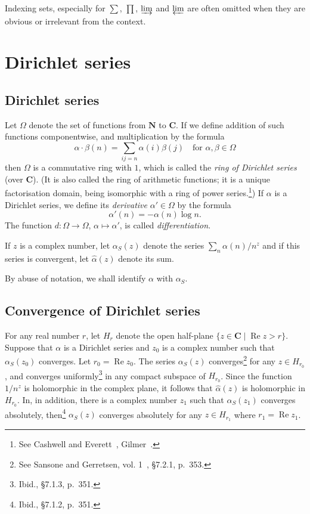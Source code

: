 \documentclass[10pt]{article}
\theoremstyle{definition}
\def\NN{\mathbf{N}}
\def\CC{\mathbf{C}}
\DeclareMathOperator{\re}{Re}
\def\fnon{See Cashwell and Everett~\cite{bib:31}, Gilmer~\cite{bib:63}.}
\def\fntw{See Sansone and Gerretsen, vol. 1~\cite{bib:162}, \S7.2.1, p.~353.}
\def\fnth{Ibid., \S7.1.3, p.~351.}
\def\fnfo{Ibid., \S7.1.2, p.~351.}
\begin{document}
Indexing sets, especially for $\sum$, $\prod$, $\varinjlim$ and $\varprojlim$ are often omitted when they are obvious or irrelevant from the context.



\section{Dirichlet series}
\label{ch:1}

\subsection{Dirichlet series}
\label{ch:1.1}

Let $\Omega$ denote the set of functions from $\NN$ to $\CC$.
If we define addition of such functions componentwise, and multiplication by the formula
\[
\alpha \cdot \beta(n)
= \sum_{ij=n} \alpha(i) \beta(j)
\quad
\text{for $\alpha,\beta \in \Omega$}
\]
then $\Omega$ is a commutative ring with $1$, which is called the \emph{ring of Dirichlet series} (over $\CC$).
(It is also called the ring of arithmetic functions; it is a unique factorisation domain, being isomorphic with a ring of power series.\footnote{\fnon})
If $\alpha$ is a Dirichlet series, we define its \emph{derivative} $\alpha' \in \Omega$ by the formula
\[
\alpha'(n) = -\alpha(n) \log n.
\]
The function $d : \Omega \to \Omega$, $\alpha \mapsto \alpha'$, is called \emph{differentiation}.

If $z$ is a complex number, let $\alpha_S(z)$ denote the series $\sum_n \alpha(n) / n^z$ and if this series is convergent, let $\widehat \alpha(z)$ denote its sum.

By abuse of notation, we shall identify $\alpha$ with $\alpha_S$.


\subsection{Convergence of Dirichlet series}
\label{ch:1.2}

For any real number $r$, let $H_r$ denote the open half-plane $\{ z \in \CC \mid \re z > r \}$.
Suppose that $\alpha$ is a Dirichlet series and $z_0$ is a complex number such that $\alpha_S(z_0)$ converges.
Let $r_0 = \re z_0$.
The series $\alpha_S(z)$ converges\footnote{\fntw} for any $z \in H_{r_0}$, and converges uniformly\footnote{\fnth} in any compact subspace of $H_{r_0}$.
Since the function $1/n^z$ is holomorphic in the complex plane, it follows that $\widehat\alpha(z)$ is holomorphic in $H_{r_0}$.
In, in addition, there is a complex number $z_1$ such that $\alpha_S(z_1)$ converges absolutely, then\footnote{\fnfo} $\alpha_S(z)$ converges absolutely for any $z \in H_{r_1}$ where $r_1 = \re z_1$.
\end{document}
